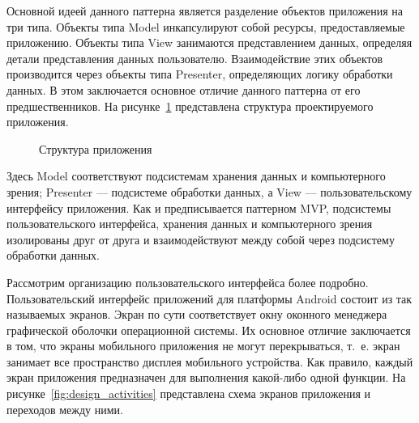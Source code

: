 Основной идеей данного паттерна является разделение объектов приложения на три типа.
Объекты типа Model инкапсулируют собой ресурсы, предоставляемые приложению.
Объекты типа View занимаются представлением данных, определяя
детали представления данных пользователю.
Взаимодействие этих объектов производится через объекты типа Presenter,
определяющих логику обработки данных.
В этом заключается основное отличие данного паттерна
от его предшественников.
На рисунке~\ref{fig:design_main} представлена структура проектируемого приложения.

\begin{figure}[h!]
  \centering
  \caption{Структура приложения}
  \label{fig:design_main}
\end{figure}

Здесь Model соответствуют подсистемам хранения данных и компьютерного зрения;
Presenter --- подсистеме обработки данных, а View ---
пользовательскому интерфейсу приложения.
Как и предписывается паттерном MVP, подсистемы пользовательского интерфейса,
хранения данных и компьютерного зрения изолированы друг от друга и взаимодействуют
между собой через подсистему обработки данных.

Рассмотрим организацию пользовательского интерфейса более подробно.
Пользовательский интерфейс приложений для платформы Android состоит
из так называемых экранов.
Экран по сути соответствует окну оконного менеджера графической оболочки
операционной системы. Их основное отличие заключается в том,
что экраны мобильного приложения не могут перекрываться,
т.~е. экран занимает все пространство дисплея
мобильного устройства.
Как правило, каждый экран приложения предназначен
для выполнения какой-либо одной функции.
На рисунке~\ref{fig:design_activities} представлена схема экранов приложения
и переходов между ними.

